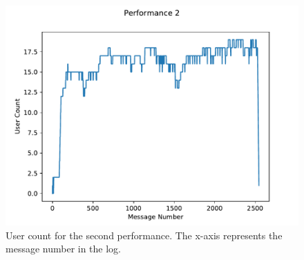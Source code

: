 \documentclass{aes2e}
\begin{document}
\begin{figure}
\centering
\includegraphics{num_analysis/p2_us.pdf}
\caption{User count for the second performance. The x-axis represents the message number in the log.}
\end{figure}
\end{document}
